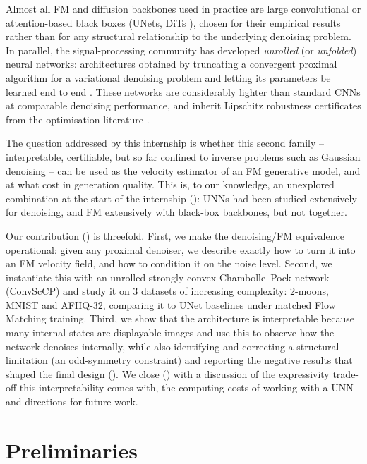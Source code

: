 \documentclass[a4paper,11pt]{article}
\theoremstyle{plain}{\theorembodyfont{\rmfamily}%
\newtheorem{proposition}[theorem]{Proposition}}
\theoremstyle{plain}{\theorembodyfont{\rmfamily}%
\newtheorem{notation}[theorem]{Notation}}
\theoremstyle{plain}{\theorembodyfont{\rmfamily}%
\newtheorem{assumption}[theorem]{Assumption}}
\theoremstyle{plain}{\theorembodyfont{\rmfamily}%
\newtheorem{problem}[theorem]{Problem}}
\theoremstyle{plain}{\theorembodyfont{\rmfamily}%
\newtheorem{example}[theorem]{Example}}
\theoremstyle{plain}{\theorembodyfont{\rmfamily}%
\newtheorem{remark}[theorem]{Remark}}
\theoremstyle{plain}{\theorembodyfont{\rmfamily}%
\newtheorem{definition}[theorem]{Definition}}
\theoremstyle{plain}{\theorembodyfont{\rmfamily}%
\newtheorem{question}[theorem]{Question}}
\numberwithin{equation}{section}
\begin{document}
Almost all FM and diffusion backbones used in practice are large convolutional or
attention-based black boxes (UNets, DiTs \cite{peebles2023scalable, esser2024scaling}),
chosen for their empirical results
rather than for any structural relationship to the underlying denoising problem.
In parallel, the signal-processing community has developed \emph{unrolled} (or
\emph{unfolded}) neural networks: architectures obtained by truncating a
convergent proximal algorithm for a variational denoising problem and letting its
parameters be learned end to end \cite{monga2021algorithm, gregor2010learning}.
These networks are considerably lighter than standard CNNs at comparable
denoising performance, and inherit Lipschitz robustness certificates from the
optimisation literature \cite{le2024unfolded, pesquet2021learning}.

The question addressed by this internship is whether this second family --
interpretable, certifiable, but so far confined to inverse problems such as
Gaussian denoising -- can be used as the velocity estimator of an FM generative
model, and at what cost in generation quality. This is, to our knowledge, an
unexplored combination at the start of the internship (): UNNs
had been studied extensively for denoising, and FM extensively with black-box
backbones, but not together.

Our contribution () is threefold. First, we make the
denoising/FM equivalence operational: given any proximal denoiser, we describe
exactly how to turn it into an FM velocity field, and how to condition it on the
noise level. Second, we instantiate this with an unrolled strongly-convex
Chambolle--Pock network (ConvScCP) and study it on 3 datasets of increasing complexity: 2-moons, MNIST and AFHQ-32,
comparing it to UNet baselines under matched Flow Matching training. Third, we
show that the architecture is interpretable because many internal states are displayable images and use this to observe how the network denoises
internally, while also identifying and correcting a structural limitation (an
odd-symmetry constraint) and reporting the negative results that shaped the
final design (). We close
() with a discussion of the
expressivity trade-off this interpretability comes with, the computing costs of working with a UNN and directions for
future work.

\section{Preliminaries}
\label{sec:preliminaries}
\end{document}
